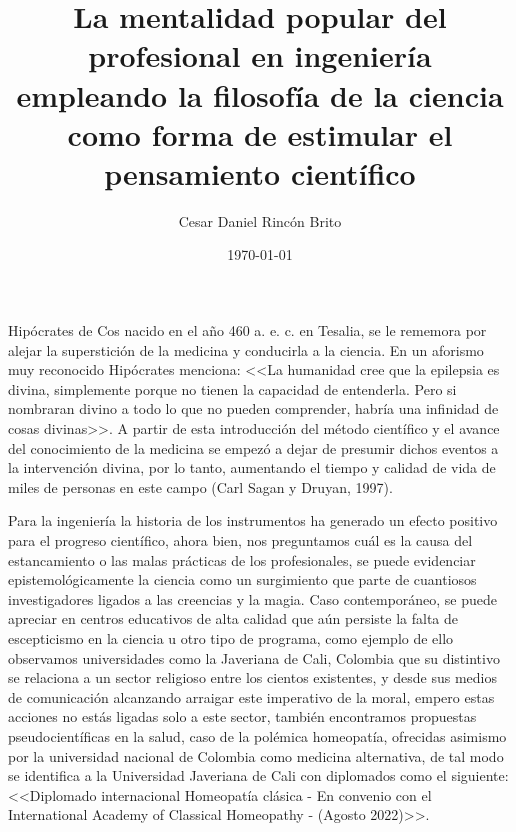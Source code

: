 \documentclass[letterpaper,12pt]{article}
\begin{document}
\title{La mentalidad popular del profesional en ingeniería empleando la filosofía de la ciencia como forma de estimular el pensamiento científico}
\author{\normalsize{Cesar Daniel Rincón Brito}}
\date{\normalsize{\today}}
\maketitle

\thispagestyle{empty}
\pagestyle{empty}

Hipócrates de Cos nacido en el año 460 a. e. c. en Tesalia, se le rememora por alejar la superstición de la medicina y conducirla a la ciencia. En un aforismo muy reconocido Hipócrates menciona: <<La humanidad cree que la epilepsia es divina, simplemente porque no tienen la capacidad de entenderla. Pero si nombraran divino a todo lo que no pueden comprender, habría una infinidad de cosas divinas>>.  A partir de esta introducción del método científico y el avance del conocimiento de la medicina se empezó a dejar de presumir dichos eventos a la intervención divina, por lo tanto, aumentando el tiempo y calidad de vida de miles de personas en este campo (Carl Sagan y Druyan, 1997).
\newline %

Para la ingeniería la historia de los instrumentos ha generado un efecto positivo para el progreso científico, ahora bien, nos preguntamos cuál es la causa del estancamiento o las malas prácticas de los profesionales, se puede evidenciar epistemológicamente la ciencia como un surgimiento que parte de cuantiosos investigadores ligados a las creencias y la magia. Caso contemporáneo, se puede apreciar en centros educativos de alta calidad que aún persiste la falta de escepticismo en la ciencia u otro tipo de programa, como ejemplo de ello observamos universidades como la Javeriana de Cali, Colombia que su distintivo se relaciona a un sector religioso entre los cientos existentes, y desde sus medios de comunicación alcanzando arraigar este imperativo de la moral, empero estas acciones no estás ligadas solo a este sector, también encontramos propuestas pseudocientíficas en la salud, caso de la polémica homeopatía, ofrecidas asimismo por la universidad nacional de Colombia como medicina alternativa, de tal modo se identifica a la Universidad Javeriana de Cali con diplomados como el siguiente: <<Diplomado internacional Homeopatía clásica - En convenio con el International Academy of Classical Homeopathy - (Agosto 2022)>>.
\newline %
\end{document}
